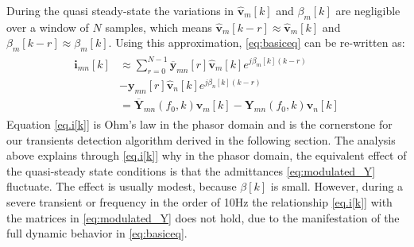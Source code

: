 \documentclass[twocolumn]{IEEEtran}
\newcommand{\bs}{\boldsymbol}
\begin{document}
During the quasi steady-state the variations in $\hat{\mathbf{v}}_m[k]$ and $\beta_m[k]$ are negligible over a window of $N$ samples, which means $\hat{\mathbf{v}}_m[k-r]\approx \hat{\mathbf{v}}_m[k]$ and $\beta_m[k-r]\approx \beta_m[k]$. Using this approximation, \eqref{eq:basiceq} can be re-written as:
\begin{align}
\begin{split}
\mathbf{i}_{mn}[k]&
\approx 
\sum_{r=0}^{N-1}\!\overline{\bs{y}}_{mn}[r]\hat{\mathbf{v}}_m[k]e^{j\beta_m[k](k-r)} \\&-\bs{y}_{mn}[r]\hat{\mathbf{v}}_n[k]e^{j\beta_n[k] (k-r)} \\
&=\overline{\bs Y}_{mn}(f_0,k)\mathbf{v}_m[k] -{\bs{Y}}_{mn}(f_0,k) \mathbf{v}_n[k]
\end{split}
\label{eq.i[k]}
\end{align}
%
Equation \eqref{eq.i[k]} is Ohm's law in the phasor domain and is the cornerstone for our transients detection algorithm derived in the following section. 
The analysis above explains through \eqref{eq.i[k]} why in the phasor domain, the equivalent effect of the quasi-steady state conditions is that the admittances \eqref{eq:modulated_Y} fluctuate. The effect is usually modest, because $\beta[k]$ is small. However, during a severe transient or frequency in the order of 10Hz the relationship \eqref{eq.i[k]} with the matrices in \eqref{eq:modulated_Y} does not hold, due to the manifestation of the full dynamic behavior in \eqref{eq:basiceq}.  
\end{document}
